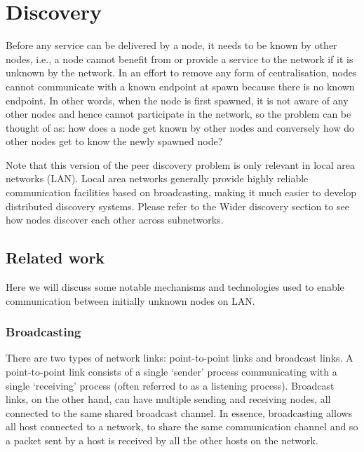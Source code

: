 \newpage


\section{Discovery}
\label{sec:discovery}


Before any service can be delivered by a node, it needs to be known by other nodes, i.e., a node cannot benefit from or provide a service to the network if it is unknown by the network. In an effort to remove any form of centralisation, nodes cannot communicate with a known endpoint at spawn because there is no known endpoint. In other words, when the node is first spawned, it is not aware of any other nodes and hence cannot participate in the network, so the problem can be thought of as: how does a node get known by other nodes and conversely how do other nodes get to know the newly spawned node?

Note that this version of the peer discovery problem is only relevant in local area networks (LAN). Local area networks generally provide highly reliable communication facilities based on broadcasting, making it much easier to develop distributed discovery systems\cite{tanenbaum2007distributed}. Please refer to the Wider discovery section to see how nodes discover each other across subnetworks.

\subsection{Related work}
Here we will discuss some notable mechanisms and technologies used to enable communication between initially unknown nodes on LAN.

\subsubsection{Broadcasting}

There are two types of network links: point-to-point links and broadcast links. A point-to-point link consists of a single `sender' process communicating with a single `receiving' process (often referred to as a listening process). Broadcast links, on the other hand, can have multiple sending and receiving nodes, all connected to the same shared broadcast channel\cite{kurose2010computer}. In essence, broadcasting allows all host connected to a network, to share the same communication channel and so a packet sent by a host is received by all the other hosts on the network.

